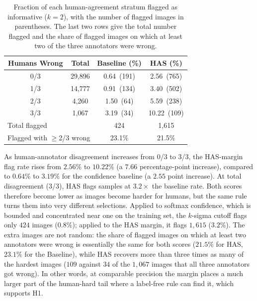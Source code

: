 \begin{table}[h]
    \centering
    \caption{Fraction of each human-agreement stratum flagged as informative
    ($k=2$), with the number of flagged images in parentheses. The last two
    rows give the total number flagged and the share of flagged images on which
    at least two of the three annotators were wrong.}
    \label{tab:cifar_sensitivity}
    \begin{tabular}{cccc}
        \toprule
        \textbf{Humans Wrong} & \textbf{Total} & \textbf{Baseline (\%)} & \textbf{HAS (\%)} \\
        \midrule
        0/3 & 29{,}896 & 0.64 \,(191) & 2.56 \,(765) \\
        1/3 & 14{,}777 & 0.91 \,(134) & 3.40 \,(502) \\
        2/3 &  4{,}260 & 1.50 \,(64)  & 5.59 \,(238) \\
        3/3 &  1{,}067 & 3.19 \,(34)  & 10.22 \,(109) \\
        \midrule
        \multicolumn{2}{l}{Total flagged} & 424 & 1{,}615 \\
        \multicolumn{2}{l}{Flagged with $\geq$2/3 wrong} & 23.1\% & 21.5\% \\
        \bottomrule
    \end{tabular}
\end{table}

As human-annotator disagreement increases from 0/3 to 3/3, the HAS-margin flag 
rate rises from $2.56\%$ to $10.22\%$ (a $7.66$ percentage-point
increase), compared to $0.64\%$ to $3.19\%$ for the confidence baseline 
(a $2.55$ point increase). At total disagreement (3/3), HAS flags
samples at $3.2\times$ the baseline rate. Both scores therefore become
lower as images become harder for humans, but the same rule turns them into
very different selections. Applied to softmax confidence, which is bounded and
concentrated near one on the training set, the $k$-sigma cutoff flags only
$424$ images ($0.8\%$); applied to the HAS margin, it flags $1{,}615$
($3.2\%$). The extra images are not random: the share of flagged images on
which at least two annotators were wrong is essentially the same for both
scores ($21.5\%$ for HAS, $23.1\%$ for the Baseline), while HAS recovers more
than three times as many of the hardest images ($109$ against $34$ of the
$1{,}067$ images that all three annotators got wrong). In other words, at
comparable precision the margin places a much larger part of the
human-hard tail where a label-free rule can find it, which supports H1.

